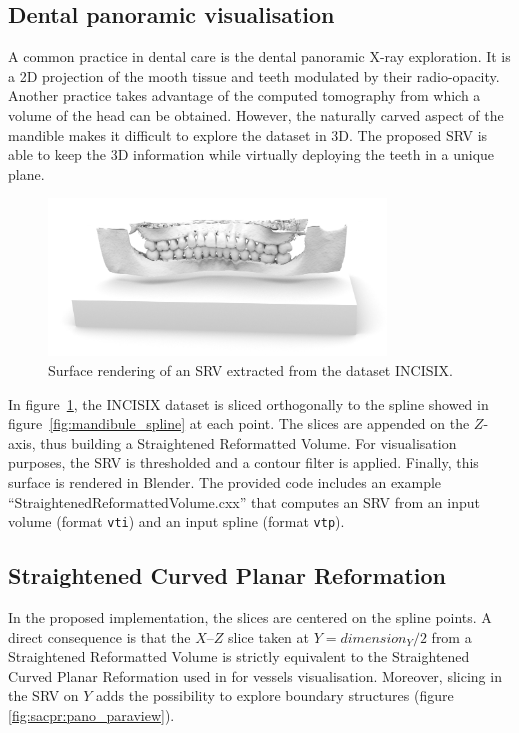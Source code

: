 \documentclass{InsightArticle}
\begin{document}
%
\subsection{Dental panoramic visualisation}
%
A common practice in dental care is the dental panoramic X-ray exploration. It
is a 2D projection of the mooth tissue and teeth modulated by their
radio-opacity. Another practice takes advantage of the computed tomography from
which a volume of the head can be obtained. However, the naturally carved aspect
of the mandible makes it difficult to explore the dataset in 3D. The proposed 
SRV is able to keep the 3D information while virtually deploying the teeth in a
unique plane.
%
\begin{figure}
\centering
\includegraphics[width=0.8\textwidth]{Images/pano_blender.png}
\caption{Surface rendering of an SRV extracted from the dataset INCISIX.}
\label{fig:pano_blender}
\end{figure}
%

In figure~\ref{fig:pano_blender}, the INCISIX dataset is sliced orthogonally to
the spline showed in figure~\ref{fig:mandibule_spline} at each point. The slices
are appended on the $Z$-axis, thus building a Straightened Reformatted Volume.
For visualisation purposes, the SRV is thresholded and a contour filter is
applied. Finally, this surface is rendered in Blender. The provided code
includes
an example ``StraightenedReformattedVolume.cxx'' that computes an SRV from an
input volume (format \verb!vti!) and an input spline (format \verb!vtp!).

%
\subsection{Straightened Curved Planar Reformation}
%
In the proposed implementation, the slices are centered on the spline points. A
direct consequence is that the $X$--$Z$ slice taken at $Y=dimension_Y/2$ from a
Straightened Reformatted Volume is strictly equivalent to the Straightened
Curved Planar Reformation used in \cite{KAN02.1} for vessels visualisation.
Moreover, slicing in the SRV on $Y$ adds the possibility to explore boundary
structures (figure \ref{fig:sacpr:pano_paraview}).
\end{document}
